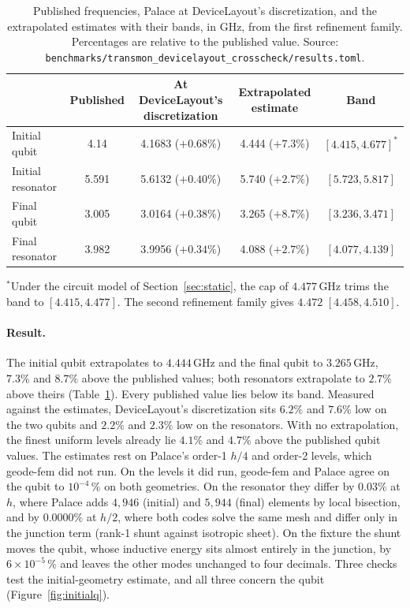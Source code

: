 \documentclass{anvil-paper}
\begin{document}
\begin{table}[htbp]
  \centering
  \caption{Published frequencies, Palace at DeviceLayout's discretization,
  and the extrapolated estimates with their bands, in GHz, from the first
  refinement family. Percentages are relative to the published value.
  Source: \texttt{benchmarks/transmon\_devicelayout\_crosscheck/results.toml}.}
  \label{tab:crosscheck}
  \footnotesize
  \begin{tabular}{@{}lcccc@{}}
    \toprule
    & Published & At DeviceLayout's discretization & Extrapolated estimate & Band \\
    \midrule
    Initial qubit & 4.14 & 4.1683 ($+0.68\%$) & 4.444 ($+7.3\%$) & $[4.415, 4.677]^{\ast}$ \\
    Initial resonator & 5.591 & 5.6132 ($+0.40\%$) & 5.740 ($+2.7\%$) & $[5.723, 5.817]$ \\
    Final qubit & 3.005 & 3.0164 ($+0.38\%$) & 3.265 ($+8.7\%$) & $[3.236, 3.471]$ \\
    Final resonator & 3.982 & 3.9956 ($+0.34\%$) & 4.088 ($+2.7\%$) & $[4.077, 4.139]$ \\
    \bottomrule
  \end{tabular}

  \smallskip
  {\footnotesize $^{\ast}$Under the circuit model of
  Section~\ref{sec:static}, the cap of $4.477$\,GHz trims the band to
  $[4.415, 4.477]$. The second refinement family gives $4.472$ $[4.458,
  4.510]$.}
\end{table}

\paragraph{Result.}
The initial qubit extrapolates to $4.444$\,GHz and the final qubit to
$3.265$\,GHz, $7.3\%$ and $8.7\%$ above the published values; both
resonators extrapolate to $2.7\%$ above theirs
(Table~\ref{tab:crosscheck}). Every published value lies below its band.
Measured against the estimates, DeviceLayout's discretization sits $6.2\%$
and $7.6\%$ low on the two qubits and $2.2\%$ and $2.3\%$ low on the
resonators. With no extrapolation, the finest uniform levels already
lie $4.1\%$ and $4.7\%$ above the published qubit values. The estimates rest
on Palace's order-1 $h/4$ and order-2 levels, which geode-fem did not run.
On the levels it did run, geode-fem and Palace agree on the qubit to
$10^{-4}\,\%$ on both geometries. On the resonator they differ by $0.03\%$
at $h$, where Palace adds $4{,}946$ (initial) and $5{,}944$ (final)
elements by local bisection, and by $0.0000\%$ at $h/2$, where both codes
solve the same mesh and differ only in the junction term (rank-1 shunt
against isotropic sheet). On the fixture the shunt moves the qubit, whose
inductive energy sits almost entirely in the junction, by
$6\times10^{-5}\,\%$ and leaves the other modes unchanged to four
decimals. Three checks test the initial-geometry estimate, and all three concern
the qubit (Figure~\ref{fig:initialq}).
\end{document}
